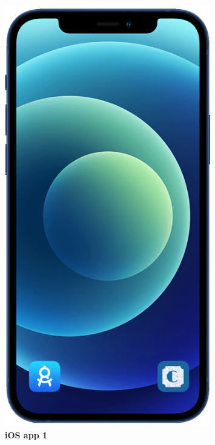 \begin{figure}[!htb]
\begin{minipage}{0.4\textwidth}
\includegraphics[width=0.8\textwidth]{Images/App/iPhone_AppIcon}
\captionsetup{justification=centering}
\caption{\label{fig:ios1}\textbf{iOS app 1}}
\end{minipage}
\end{figure}

\newpage

